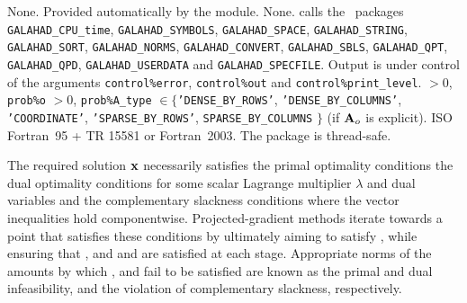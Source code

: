 \documentclass{galahad}
\newcommand{\packagename}{SLLS}
\begin{document}

\galgeneral

\galcommon None.
\galworkspace Provided automatically by the module.
\galroutines None.
\galmodules {\tt \packagename\_solve} calls the \galahad\ packages
{\tt GALAHAD\_CPU\_time},
{\tt GALAHAD\_SY\-M\-BOLS}, \newline
{\tt GALAHAD\_SPACE},
{\tt GALAHAD\_STRING},
{\tt GALAHAD\_SORT},
{\tt GALAHAD\_NORMS},
{\tt GALAHAD\_CONVERT},
{\tt GALAHAD\_SBLS}, \newline
{\tt GALAHAD\_QPT},
{\tt GALAHAD\_QPD},
{\tt GALAHAD\_USERDATA} and
{\tt GALAHAD\_SPECFILE}.
\galio Output is under control of the arguments
 {\tt control\%error}, {\tt control\%out} and {\tt control\%print\_level}.
 $> 0$, {\tt prob\%o} $> 0$,
{\tt prob\%A\_type} $\in \{${\tt 'DENSE\_BY\_ROWS'}, {\tt 'DENSE\_BY\_COLUMNS'},
 {\tt 'COORDINATE'}, {\tt 'SPARSE\_BY\_\-ROWS'},
 {\tt SPARSE\_BY\_COLUMNS} $\}$
(if ${\mathbf{A}}_o$ is explicit).
\galportability ISO Fortran~95 + TR 15581 or Fortran~2003.
The package is thread-safe.


\galmethod
The required solution ${\mathbf{x}}$ necessarily satisfies
the primal optimality conditions
the dual optimality conditions
for some scalar Lagrange multiplier $\lambda$ and dual variables
and the complementary slackness conditions
where the vector inequalities hold componentwise.
Projected-gradient methods iterate towards a point
that satisfies these conditions by ultimately aiming to satisfy
, while ensuring that
, and  and  are satisfied at each stage.
Appropriate norms of the amounts by
which ,  and  fail to be satisfied are known as the
primal and dual infeasibility, and the violation of complementary slackness,
respectively.
\end{document}

